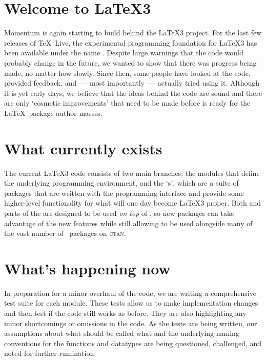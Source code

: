 \documentclass{ltnews}
\begin{document}
\maketitle

\section{Welcome to \LaTeX3}

Momentum is again starting to build behind the \LaTeX3 project. For the
last few releases of \TeX~Live, the experimental programming foundation for
\LaTeX3 has been available under the name . Despite large
warnings that the code would probably change in the future, we wanted to show
that there was progress being made, no matter how slowly. Since then, some
people have looked at the code, provided feedback, and~--- most
importantly~--- actually tried using it. Although it is yet early days, we
believe that the ideas behind the code are sound and there are only `cosmetic
improvements' that need to be made before  is ready for the
\LaTeX~package author masses.

\section{What currently exists}

The current \LaTeX3 code consists of two main branches: the
 modules that define the underlying programming environment,
and the `s', which are a suite of packages that are written
with the  programming interface and provide some higher-level
functionality for what will one day become \LaTeX3 proper. Both  and
parts of the  are designed to be used \emph{on top} of
\LaTeXe, so new packages can take advantage of the new features while still
allowing to be used alongside many of the vast number of \LaTeXe\ packages on
\textsc{ctan}.

\section{What's happening now}

In preparation for a minor overhaul of the  code, we are
writing a comprehensive test suite for each module. These tests allow us to
make implementation changes and then test if the code still works as before.
They are also highlighting any minor shortcomings or omissions in the code.
As the tests are being written, our assumptions about what should be called
what and the underlying naming conventions for the functions and datatypes are
being questioned, challenged, and noted for further rumination.
\end{document}
